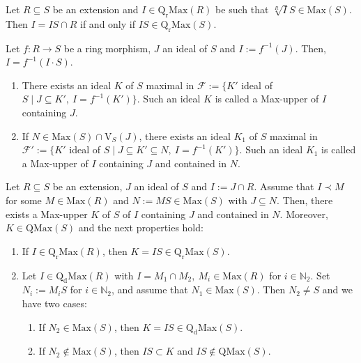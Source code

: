\documentclass[10pt,a4paper]{amsart}
\begin{document}
\begin{corollary}\label{3.2} Let $R\subseteq S$ be an extension and $I\in \mathrm{Q_rMax}(R)$ be such that $\sqrt[R]IS\in\mathrm{Max}(S)$. Then $I=IS\cap R$ if and only if $IS\in\mathrm {Q_rMax}(S)$. 
\end{corollary}

\begin{lemma}\label{3.53} Let $f:R\to S$ be a ring morphism, $J$ an ideal of $S$ and $I:=f^{-1}(J)$. Then, $I=f^{-1}(I\cdot S)$.
 \begin{enumerate}
\item There exists an ideal $K$ of $S$ maximal in $\mathcal F:=\{K'$ ideal of $S\mid J\subseteq K',\ I=f^{-1}(K')\}$. Such an ideal $K$ is called a Max-upper of $I$ containing $J$.
\item If $N\in\mathrm{Max}(S)\cap\mathrm{V}_S(J)$, there exists an ideal $K_1$ of $S$ maximal in $\mathcal F':=\{K'$ ideal of $S\mid J\subseteq K' \subseteq N,\ I=f^{-1}(K')\}$. Such an ideal $K_1$ is called a Max-upper of $I$ containing $J$ and contained in $N$.
\end{enumerate}
 \end{lemma}

\begin{proposition}\label{3.52} Let $R\subseteq S$ be an extension, $J$ an ideal of $S$ and $I:=J\cap R$. Assume that $I\prec M$ for some $M\in\mathrm{Max}(R)$ and $N:=MS\in\mathrm{Max}(S)$ with $J\subseteq N$. Then, there exists a Max-upper $K$ of $S$ of $I$ containing $J$ and contained in $N$. Moreover, $K\in\mathrm{QMax}(S)$ and the next 
  properties hold:
\begin{enumerate} 
\item If $I\in\mathrm{Q_rMax}(R)$, then $K=IS\in\mathrm{Q_rMax}(S)$. 
\item Let $I\in\mathrm{Q_dMax}(R)$ with $I=M_1\cap M_2,\ M_i\in\mathrm {Max}(R)$ for $i\in\mathbb N_2$. Set $N_i:=M_iS$ for $i\in\mathbb N_2$, and assume that $N_1\in\mathrm{Max}(S)$. Then $N_2\neq S$ and we have two cases: 
\begin{enumerate}
\item If $N_2\in\mathrm{Max}(S)$, then $K=IS\in\mathrm{Q_dMax}(S)$.  
\item If $N_2\not\in\mathrm{Max}(S)$, then $IS\subset K$ and $IS\not\in \mathrm{QMax}(S)$.
\end{enumerate}
\end{enumerate}
\end{proposition}
\end{document}
